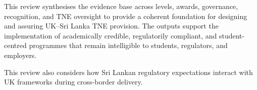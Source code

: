 This review synthesises the evidence base across levels, awards, governance, recognition, and TNE oversight to provide a coherent foundation for designing and assuring UK--Sri Lanka TNE provision. The outputs support the implementation of academically credible, regulatorily compliant, and student-centred programmes that remain intelligible to students, regulators, and employers.

This review also considers how Sri Lankan regulatory expectations interact with UK frameworks during cross-border delivery.
